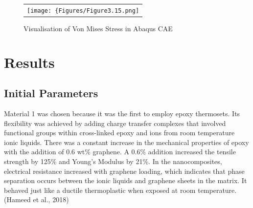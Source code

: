 \documentclass[a4paper,12pt]{article}
\numberwithin{equation}{section}
\numberwithin{figure}{section}
\begin{document}
\begin{figure}[H]
  \centering
  \begin{tabular}{@{}c@{}}
    \texttt{[image: \{Figures/Figure3.15.png]}} \\
  \end{tabular}
  \caption {Visualisation of Von Mises Stress in Abaqus CAE}
\end{figure}

\newpage
\section{Results}

\subsection{Initial Parameters}


\begin{table}[hbt!]
\caption{Materials Properties}
\end{table}

\noindent Material 1 was chosen because it was the first to employ epoxy thermosets. Its flexibility was achieved by adding charge transfer complexes that involved functional groups within cross-linked epoxy and ions from room temperature ionic liquids. There was a constant increase in the mechanical properties of epoxy with the addition of 0.6 wt\% graphene. A 0.6\% addition increased the tensile strength by 125\% and Young's Modulus by 21\%. In the nanocomposites, electrical resistance increased with graphene loading, which indicates that phase separation occurs between the ionic liquids and graphene sheets in the matrix. It behaved just like a ductile thermoplastic when exposed at room temperature. (Hameed et al., 2018)\vspace{\baselineskip}
\end{document}
